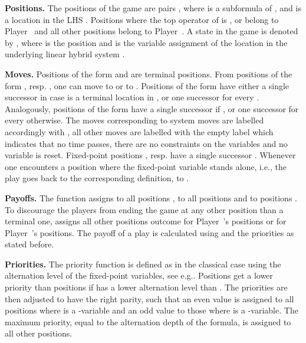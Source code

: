 \documentclass[fleqn,envcountsame]{LMCS}
\newcommand{\eg}{e.g.\xspace}
\newcommand{\ie}{i.e.\xspace}
\newcommand{\pzero}{Player~\xspace}
\newcommand{\pone}{Player~\xspace}
\begin{document}
\textbf{Positions.}
The positions of the game are pairs ,
where  is a subformula of , and
 is a location in the LHS .
Positions  where the top operator
of  is , or  belong to \pone and
all other positions belong to \pzero.
A state in the game is denoted by , where 
is the position and  is the variable assignment of
the location  in the underlying linear hybrid system .

\textbf{Moves.} 
Positions of the form  and 
are terminal positions.
From positions of the form ,
resp. , one can move to 
 or to  .
Positions of the form  have
either a single successor  in case  is a terminal 
location in , or one successor  for every
. Analogously, positions of the form 
have a single successor  if ,
or one successor  for every  otherwise.
The moves corresponding to system moves  are labelled
accordingly with , all other 
moves are labelled with the empty label 
which indicates that no time passes, there are no constraints on the variables
and no variable is reset.
Fixed-point positions , resp. 
have a single successor .
Whenever one encounters a position where the fixed-point variable stands alone,
\ie , the play goes back to the corresponding definition,
to .

\textbf{Payoffs.} 
The function  assigns 
to all positions ,  to all
positions 
and  to positions .
To discourage the players from ending the game at any other position
than a terminal one,  assigns all other positions
outcome  for \pzero's positions or 
for \pone's positions.
The payoff  of a play  is calculated
using  and the priorities as stated before.

\textbf{Priorities.} 
The priority function  is defined as in the classical case
using the alternation level of the fixed-point variables,
see \eg \cite{Graedel03}.
Positions  get a lower priority
than positions  if  has a lower alternation level than .
The priorities are then adjusted to have the right parity, such that
an even value is assigned to all positions  where  is a 
-variable and an odd value to those where  is a -variable.
The maximum priority, equal to the alternation depth of the formula,
is assigned to all other positions.
\end{document}
